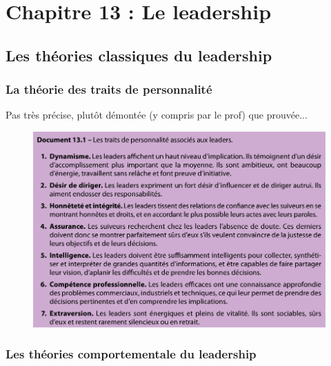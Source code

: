 \documentclass[letterpaper, 12pt]{article}
\begin{document}
\section{Chapitre 13 : Le leadership}
	\subsection{Les théories classiques du leadership}
		\subsubsection{La théorie des traits de personnalité}
			Pas très précise, plutôt démontée (y compris par le prof) que prouvée...
			\begin{figure}[H]
				\centering
				\includegraphics[scale=0.675]{Images/traits}
			\end{figure}\noindent
		\subsubsection{Les théories comportementale du leadership}
\end{document}
